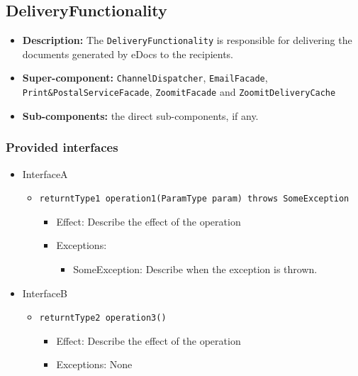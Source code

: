 \documentclass[a4paper,10pt]{article}
\begin{document}
\subsection{DeliveryFunctionality}
\begin{itemize}
    \item \textbf{Description:} The \texttt{DeliveryFunctionality} is responsible  for delivering the documents generated by eDocs to the recipients. 
    \item \textbf{Super-component:} \texttt{ChannelDispatcher}, \texttt{EmailFacade}, \texttt{Print\&PostalServiceFacade}, \texttt{ZoomitFacade} and \texttt{ZoomitDeliveryCache}
    \item \textbf{Sub-components:} the direct sub-components, if any.
\end{itemize}

\subsubsection*{Provided interfaces}
\begin{itemize}
    \item InterfaceA
    \begin{itemize}
        \item \texttt{returntType1 operation1(ParamType param) throws SomeException}
        \begin{itemize}
            \item Effect: Describe the effect of the operation
            \item Exceptions:
            \begin{itemize}
                \item SomeException: Describe when the exception is thrown.
            \end{itemize}
        \end{itemize}
    \end{itemize}

    \item InterfaceB
    \begin{itemize}
        \item \texttt{returntType2 operation3()}
        \begin{itemize}
            \item Effect: Describe the effect of the operation
            \item Exceptions: None
        \end{itemize}
    \end{itemize}
\end{itemize}
\end{document}

